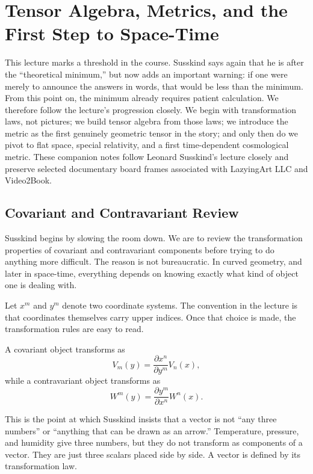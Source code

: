\chapter{Tensor Algebra, Metrics, and the First Step to Space-Time}

This lecture marks a threshold in the course. Susskind says again that he is after the ``theoretical minimum,'' but now adds an important warning: if one were merely to announce the answers in words, that would be less than the minimum. From this point on, the minimum already requires patient calculation. We therefore follow the lecture's progression closely. We begin with transformation laws, not pictures; we build tensor algebra from those laws; we introduce the metric as the first genuinely geometric tensor in the story; and only then do we pivot to flat space, special relativity, and a first time-dependent cosmological metric. These companion notes follow Leonard Susskind's lecture closely and preserve selected documentary board frames associated with LazyingArt LLC and Video2Book.

\section{Covariant and Contravariant Review}

Susskind begins by slowing the room down. We are to review the transformation properties of covariant and contravariant components before trying to do anything more difficult. The reason is not bureaucratic. In curved geometry, and later in space-time, everything depends on knowing exactly what kind of object one is dealing with.

Let \(x^m\) and \(y^m\) denote two coordinate systems. The convention in the lecture is that coordinates themselves carry upper indices. Once that choice is made, the transformation rules are easy to read.

A covariant object transforms as
\begin{equation}
V_m(y)=\frac{\partial x^n}{\partial y^m}V_n(x),
\end{equation}
while a contravariant object transforms as
\begin{equation}
W^m(y)=\frac{\partial y^m}{\partial x^n}W^n(x).
\end{equation}

This is the point at which Susskind insists that a vector is not ``any three numbers'' or ``anything that can be drawn as an arrow.'' Temperature, pressure, and humidity give three numbers, but they do not transform as components of a vector. They are just three scalars placed side by side. A vector is defined by its transformation law.

